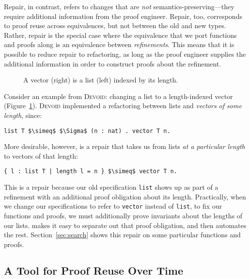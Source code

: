 Repair, in contrast, refers to changes that are \textit{not} semantics-preserving---they require additional information
from the proof engineer.
Repair, too, corresponds to proof reuse across equivalences, but not between the old and new types.
Rather, repair is the special case where the equivalence that we port functions and proofs along
is an equivalence between \textit{refinements}.
This means that it is possible to reduce repair to refactoring, as long as the proof engineer supplies the additional information in
order to construct proofs about the refinement.

\begin{figure}
\begin{minipage}{0.40\textwidth}
   
\end{minipage}
\hfill
\begin{minipage}{0.58\textwidth}
   
\end{minipage}
\caption{A vector (right) is a list (left) indexed by its length.}
\label{fig:listtovect}
\end{figure}

Consider an example from \textsc{Devoid}: changing a list to a length-indexed vector (Figure~\ref{fig:listtovect}).
\textsc{Devoid} implemented a refactoring between lists and \textit{vectors of some length}, since:

\begin{lstlisting}
list T $\simeq$ $\Sigma$ (n : nat) . vector T n.
\end{lstlisting}
More desirable, however, is a repair that takes us from lists \textit{at a particular length} to vectors of that length:

\begin{lstlisting}
{ l : list T | length l = n } $\simeq$ vector T n.
\end{lstlisting}
This is a repair because our old specification \lstinline{list} shows up as part of a refinement with an additional proof obligation
about its length. Practically, when we change our specifications to refer to \lstinline{vector} instead of \lstinline{list},
to fix our functions and proofs, we must additionally prove invariants about the lengths of our lists.
\toolname makes it easy to separate out that proof obligation, and then automates the rest.
Section~\ref{sec:search} shows this repair on some particular functions and proofs.

\subsection{A Tool for Proof Reuse Over Time}
\label{sec:time}


